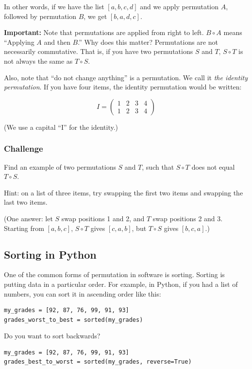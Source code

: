 In other words, if we have the list $[a, b, c, d]$ and we apply permutation $A$, followed by permutation $B$, we get $[b, a, d, c]$.

\textbf{Important:} Note that permutations are applied from right to
left. $B \circ A$ means ``Applying $A$ and then $B$.''  Why does this matter?
Permutations are not necessarily commutative. That is, if you have two
permutations $S$ and $T$, $S \circ T$ is not always the same as $T
\circ S$.

Also, note that ``do not change anything'' is a permutation. We call it
\textit{the identity permutation}. If you have four items, the identity
permutation would be written:

$$I = \begin{pmatrix}
  1 & 2 & 3 & 4 \\
  1 & 2 & 3 & 4
\end{pmatrix}$$

(We use a capital ``I'' for the identity.)

\subsubsection{Challenge} Find an example of two permutations $S$ and $T$, such that $S \circ T$ does not equal $T \circ S$.

Hint: on a list of three items, try swapping the first two items and swapping the last two items.

(One answer: let $S$ swap positions 1 and 2, and $T$ swap positions 2 and 3. Starting from $[a, b, c]$, $S \circ T$ gives $[c, a, b]$, but $T \circ S$ gives $[b, c, a]$.)

\subsection{Sorting in Python}

One of the common forms of permutation in software is sorting.
Sorting is putting data in a particular order. For example, in Python,
if you had a list of numbers, you can sort it in ascending order like
this:

\begin{verbatim}
my_grades = [92, 87, 76, 99, 91, 93]
grades_worst_to_best = sorted(my_grades)
\end{verbatim}

Do you want to sort backwards?

\begin{verbatim}
my_grades = [92, 87, 76, 99, 91, 93]
grades_best_to_worst = sorted(my_grades, reverse=True)
\end{verbatim}

